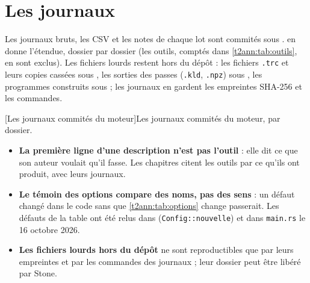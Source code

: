 \section{Les journaux}\label{t2ann:sec:journaux}

Les journaux bruts, les CSV et les notes de chaque lot sont commités sous .  en donne l'étendue, dossier par dossier (les outils, comptés dans \cref{t2ann:tab:outils}, en sont exclus). Les fichiers lourds restent hors du dépôt : les fichiers \texttt{.trc} et leurs copies cassées sous , les sorties des passes (\texttt{.kld}, \texttt{.npz}) sous , les programmes construits sous  ; les journaux en gardent les empreintes SHA-256 et les commandes.

\begingroup
{}[Les journaux commités du moteur]{Les journaux commités du moteur, par dossier.}\label{t2ann:tab:journaux}

\endgroup

\begin{faux}
\begin{itemize}
\item \textbf{La première ligne d'une description n'est pas l'outil} : elle dit ce que son auteur voulait qu'il fasse. Les chapitres citent les outils par ce qu'ils ont produit, avec leurs journaux.
\item \textbf{Le témoin des options compare des noms, pas des sens} : un défaut changé dans le code sans que \cref{t2ann:tab:options} change passerait. Les défauts de la table ont été relus dans  (\texttt{Config::nouvelle}) et dans \texttt{main.rs} le 16 octobre 2026.
\item \textbf{Les fichiers lourds hors du dépôt} ne sont reproductibles que par leurs empreintes et par les commandes des journaux ; leur dossier peut être libéré par Stone.
\end{itemize}
\end{faux}
